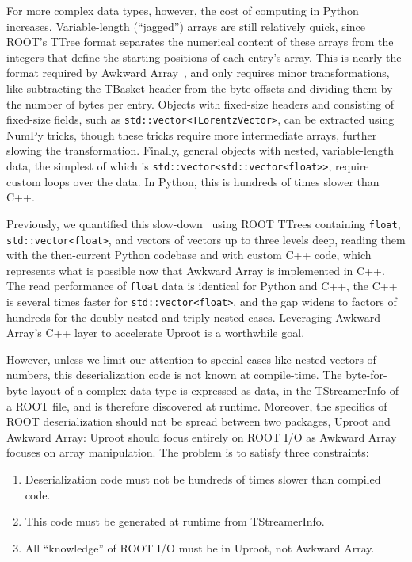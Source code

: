 \documentclass{webofc}
\begin{document}
For more complex data types, however, the cost of computing in Python increases. Variable-length (``jagged'') arrays are still relatively quick, since ROOT's TTree format separates the numerical content of these arrays from the integers that define the starting positions of each entry's array. This is nearly the format required by Awkward Array~\cite{awkward}, and only requires minor transformations, like subtracting the TBasket header from the byte offsets and dividing them by the number of bytes per entry. Objects with fixed-size headers and consisting of fixed-size fields, such as \texttt{std::vector<TLorentzVector>}, can be extracted using NumPy tricks, though these tricks require more intermediate arrays, further slowing the transformation. Finally, general objects with nested, variable-length data, the simplest of which is \texttt{std::vector<std::vector<float>>}, require custom loops over the data. In Python, this is hundreds of times slower than C++.

Previously, we quantified this slow-down~\cite{chep2019} using ROOT TTrees containing \texttt{float}, \texttt{std::vector<float>}, and vectors of vectors up to three levels deep, reading them with the then-current Python codebase and with custom C++ code, which represents what is possible now that Awkward Array is implemented in C++. The read performance of \texttt{float} data is identical for Python and C++, the C++ is several times faster for \texttt{std::vector<float>}, and the gap widens to factors of hundreds for the doubly-nested and triply-nested cases. Leveraging Awkward Array's C++ layer to accelerate Uproot is a worthwhile goal.

However, unless we limit our attention to special cases like nested vectors of numbers, this deserialization code is not known at compile-time. The byte-for-byte layout of a complex data type is expressed as data, in the TStreamerInfo of a ROOT file, and is therefore discovered at runtime. Moreover, the specifics of ROOT deserialization should not be spread between two packages, Uproot and Awkward Array: Uproot should focus entirely on ROOT I/O as Awkward Array focuses on array manipulation. The problem is to satisfy three constraints:
\begin{enumerate}
\item Deserialization code must not be hundreds of times slower than compiled code.
\item This code must be generated at runtime from TStreamerInfo.
\item All ``knowledge'' of ROOT I/O must be in Uproot, not Awkward Array.
\end{enumerate}
\end{document}
